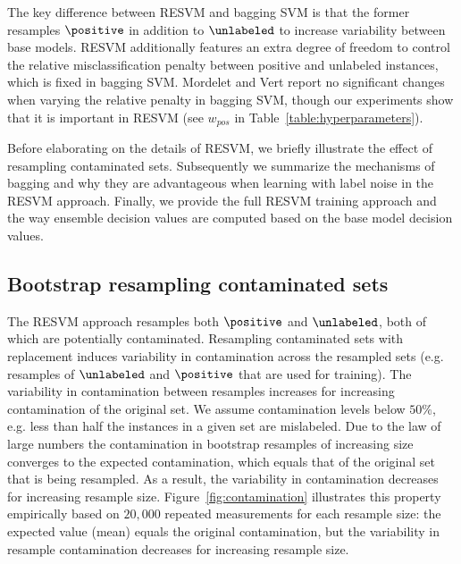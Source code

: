 The key difference between RESVM and bagging SVM is that the former resamples $\positive$ in addition to $\unlabeled$ to increase variability between base models. RESVM additionally features an extra degree of freedom to control the relative misclassification penalty between positive and unlabeled instances, which is fixed in bagging SVM. Mordelet and Vert \citep{mordelet2014bagging} report no significant changes when varying the relative penalty in bagging SVM, though our experiments show that it is important in RESVM (see $w_{pos}$ in Table~\ref{table:hyperparameters}).

Before elaborating on the details of RESVM, we briefly illustrate the effect of resampling contaminated sets. Subsequently we summarize the mechanisms of bagging and why they are advantageous when learning with label noise in the RESVM approach. Finally, we provide the full RESVM training approach and the way ensemble decision values are computed based on the base model decision values.



\subsection{Bootstrap resampling contaminated sets} \label{resampling}

The RESVM approach resamples both $\positive$ and $\unlabeled$, both of which are potentially contaminated. Resampling contaminated sets with replacement induces variability in contamination across the resampled sets (e.g. resamples of $\unlabeled$ and $\positive$ that are used for training). The variability in contamination between resamples increases for increasing contamination of the original set. We assume contamination levels below $50\%$, e.g. less than half the instances in a given set are mislabeled. Due to the law of large numbers the contamination in bootstrap resamples of increasing size converges to the expected contamination, which equals that of the original set that is being resampled. As a result, the variability in contamination decreases for increasing resample size. Figure~\ref{fig:contamination} illustrates this property empirically based on $20,000$ repeated measurements for each resample size: the expected value (mean) equals the original contamination, but the variability in resample contamination decreases for increasing resample size.

